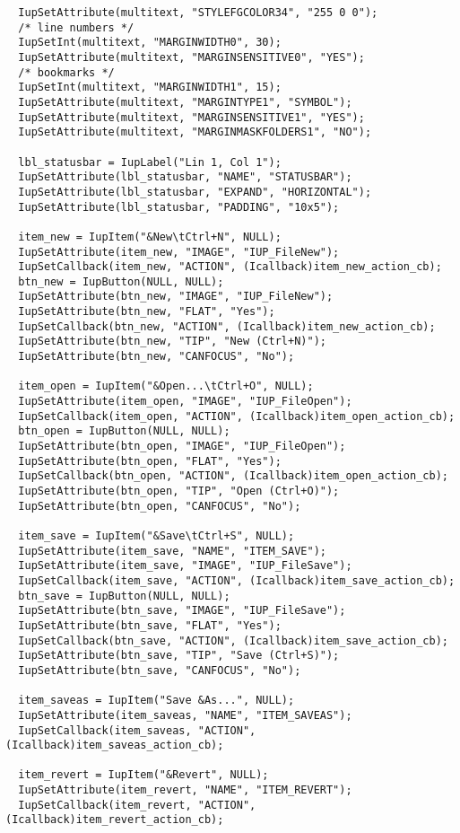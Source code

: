 \documentclass{ctexart}
\begin{document}
\begin{lstlisting}
  IupSetAttribute(multitext, "STYLEFGCOLOR34", "255 0 0");
  /* line numbers */
  IupSetInt(multitext, "MARGINWIDTH0", 30);
  IupSetAttribute(multitext, "MARGINSENSITIVE0", "YES");
  /* bookmarks */
  IupSetInt(multitext, "MARGINWIDTH1", 15);
  IupSetAttribute(multitext, "MARGINTYPE1", "SYMBOL");
  IupSetAttribute(multitext, "MARGINSENSITIVE1", "YES");
  IupSetAttribute(multitext, "MARGINMASKFOLDERS1", "NO");

  lbl_statusbar = IupLabel("Lin 1, Col 1");
  IupSetAttribute(lbl_statusbar, "NAME", "STATUSBAR");
  IupSetAttribute(lbl_statusbar, "EXPAND", "HORIZONTAL");
  IupSetAttribute(lbl_statusbar, "PADDING", "10x5");

  item_new = IupItem("&New\tCtrl+N", NULL);
  IupSetAttribute(item_new, "IMAGE", "IUP_FileNew");
  IupSetCallback(item_new, "ACTION", (Icallback)item_new_action_cb);
  btn_new = IupButton(NULL, NULL);
  IupSetAttribute(btn_new, "IMAGE", "IUP_FileNew");
  IupSetAttribute(btn_new, "FLAT", "Yes");
  IupSetCallback(btn_new, "ACTION", (Icallback)item_new_action_cb);
  IupSetAttribute(btn_new, "TIP", "New (Ctrl+N)");
  IupSetAttribute(btn_new, "CANFOCUS", "No");

  item_open = IupItem("&Open...\tCtrl+O", NULL);
  IupSetAttribute(item_open, "IMAGE", "IUP_FileOpen");
  IupSetCallback(item_open, "ACTION", (Icallback)item_open_action_cb);
  btn_open = IupButton(NULL, NULL);
  IupSetAttribute(btn_open, "IMAGE", "IUP_FileOpen");
  IupSetAttribute(btn_open, "FLAT", "Yes");
  IupSetCallback(btn_open, "ACTION", (Icallback)item_open_action_cb);
  IupSetAttribute(btn_open, "TIP", "Open (Ctrl+O)");
  IupSetAttribute(btn_open, "CANFOCUS", "No");

  item_save = IupItem("&Save\tCtrl+S", NULL);
  IupSetAttribute(item_save, "NAME", "ITEM_SAVE");
  IupSetAttribute(item_save, "IMAGE", "IUP_FileSave");
  IupSetCallback(item_save, "ACTION", (Icallback)item_save_action_cb);
  btn_save = IupButton(NULL, NULL);
  IupSetAttribute(btn_save, "IMAGE", "IUP_FileSave");
  IupSetAttribute(btn_save, "FLAT", "Yes");
  IupSetCallback(btn_save, "ACTION", (Icallback)item_save_action_cb);
  IupSetAttribute(btn_save, "TIP", "Save (Ctrl+S)");
  IupSetAttribute(btn_save, "CANFOCUS", "No");

  item_saveas = IupItem("Save &As...", NULL);
  IupSetAttribute(item_saveas, "NAME", "ITEM_SAVEAS");
  IupSetCallback(item_saveas, "ACTION", (Icallback)item_saveas_action_cb);

  item_revert = IupItem("&Revert", NULL);
  IupSetAttribute(item_revert, "NAME", "ITEM_REVERT");
  IupSetCallback(item_revert, "ACTION", (Icallback)item_revert_action_cb);


\end{lstlisting}
\end{document}
